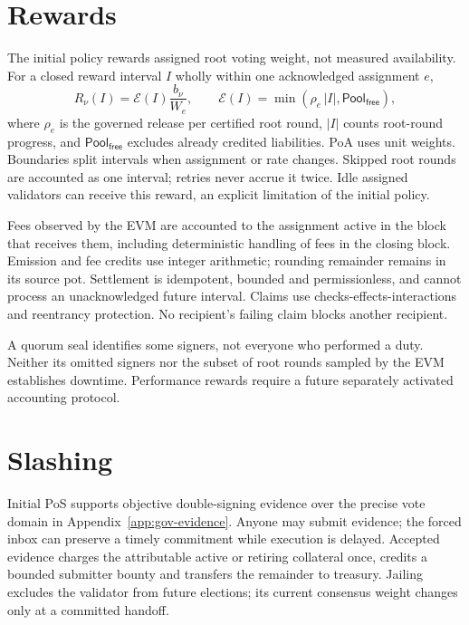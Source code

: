 \section{Rewards}\label{sec:gov-rewards}

The initial policy rewards assigned root voting weight, not measured availability. For a closed reward interval $I$ wholly within one acknowledged assignment $e$,
\[
 R_\nu(I)=\mathcal{E}(I)\frac{b_\nu}{W_e},\qquad
 \mathcal{E}(I)=\min(\rho_e\,|I|,\mathsf{Pool}_{\mathsf{free}}),
\]
where $\rho_e$ is the governed release per certified root round, $|I|$ counts root-round progress, and $\mathsf{Pool}_{\mathsf{free}}$ excludes already credited liabilities. PoA uses unit weights. Boundaries split intervals when assignment or rate changes. Skipped root rounds are accounted as one interval; retries never accrue it twice. Idle assigned validators can receive this reward, an explicit limitation of the initial policy.

Fees observed by the EVM are accounted to the assignment active in the block that receives them, including deterministic handling of fees in the closing block. Emission and fee credits use integer arithmetic; rounding remainder remains in its source pot. Settlement is idempotent, bounded and permissionless, and cannot process an unacknowledged future interval. Claims use checks-effects-interactions and reentrancy protection. No recipient's failing claim blocks another recipient.

A quorum seal identifies some signers, not everyone who performed a duty. Neither its omitted signers nor the subset of root rounds sampled by the EVM establishes downtime. Performance rewards require a future separately activated accounting protocol.

\section{Slashing}\label{sec:gov-slashing}

Initial PoS supports objective double-signing evidence over the precise vote domain in Appendix~\ref{app:gov-evidence}. Anyone may submit evidence; the forced inbox can preserve a timely commitment while execution is delayed. Accepted evidence charges the attributable active or retiring collateral once, credits a bounded submitter bounty and transfers the remainder to treasury. Jailing excludes the validator from future elections; its current consensus weight changes only at a committed handoff.

